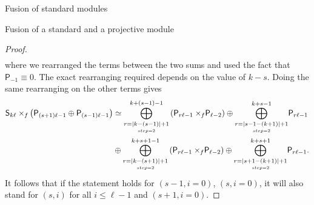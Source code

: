 \documentclass[reqno]{amsart}
\newcommand{\ds}[1]{\mathsf S_{#1}}
\newcommand{\dP}[1]{\mathsf P_{#1}}
\newcommand{\xf}{\times\hspace{-0.27em}_f}
\newcommand{\lc}{\ell}
\begin{document}
\begin{section}{Fusion of standard modules}
\begin{subsection}{Fusion of a standard and a projective module}
\begin{proof}
\begin{align*}
\end{align*}
where we rearranged the terms between the two sums and used the fact that $\dP{-1} \equiv 0$. The exact rearranging required depends on the value of $k-s$. Doing the same rearranging on the other terms gives
\begin{align*}
	\ds{k \lc} \xf \left(\dP{(s+1) \lc -1} \oplus  \dP{(s-1)\lc -1}\right) & \simeq \overset{k+(s-1)-1}{\underset{\underset{step =2}{r = |k-(s-1)| + 1}}{\bigoplus}}\left( \dP{r \lc -1} \xf \dP{\lc-2}\right) \oplus \overset{k+s-1}{\underset{\underset{step =2}{r = |s-1-(k+1)| + 1}}{\bigoplus}} \dP{r \lc -1} \\
	& \oplus \overset{k+s+1-1}{\underset{\underset{step =2}{r = |k-(s+1)| + 1}}{\bigoplus}}\left( \dP{r \lc -1} \xf \dP{\lc-2}\right) \oplus \overset{k+s+1}{\underset{\underset{step =2}{r = |s+1-(k+1)| + 1}}{\bigoplus}} \dP{r \lc -1}.  
\end{align*}
It follows that if the statement holds for $(s-1,i=0)$, $(s,i=0)$, it will also stand for $(s,i)$ for all $i \leq \ell -1$ and $(s+1,i =0)$. 


\end{proof}
\end{subsection}
\end{section}
\end{document}
